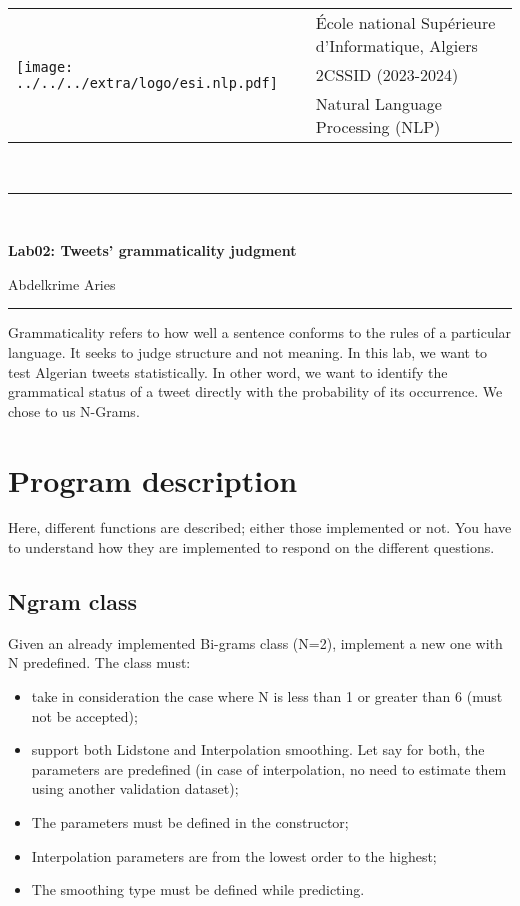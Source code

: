 \documentclass[11pt, a4paper]{article}
\begin{document}
	

\pagestyle{fancy}

\noindent
\begin{tabular}{ll}
	\multirow{3}{*}{\texttt{[image: ../../../extra/logo/esi.nlp.pdf]}} & \'Ecole national Supérieure d'Informatique, Algiers\\
	& 2CSSID (2023-2024)\\
	& Natural Language Processing (NLP)
\end{tabular}\\[.25cm]
\noindent\rule{\textwidth}{1pt}\\[-0.25cm]
\begin{center}
	{\LARGE \textbf{Lab02: Tweets' grammaticality judgment}}
	\begin{flushright}
		Abdelkrime Aries
	\end{flushright}
\end{center}\vspace*{-0.25cm}
\noindent\rule{\textwidth}{1pt}

Grammaticality refers to how well a sentence conforms to the rules of a particular language. 
It seeks to judge structure and not meaning. 
In this lab, we want to test Algerian tweets statistically.
In other word, we want to identify the grammatical status of a tweet directly with the probability of its occurrence.
We chose to us N-Grams.

\section{Program description}

Here, different functions are described; either those implemented or not. 
You have to understand how they are implemented to respond on the different questions.

\subsection{Ngram class}

Given an already implemented Bi-grams class (N=2), implement a new one with N predefined.
The class must:
\begin{itemize}
	\item take in consideration the case where N is less than 1 or greater than 6 (must not be accepted);
	\item support both Lidstone and Interpolation smoothing. 
	Let say for both, the parameters are predefined (in case of interpolation, no need to estimate them using another validation dataset);
	\item The parameters must be defined in the constructor;
	\item Interpolation parameters are from the lowest order to the highest;
	\item The smoothing type must be defined while predicting.
\end{itemize}
\end{document}
